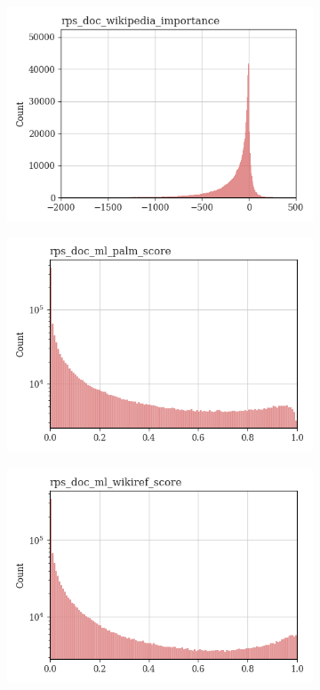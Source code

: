 \documentclass{article}
\begin{document}
\begin{figure}
\begin{subfigure}[b]{0.32\textwidth}
        \includegraphics[width=\textwidth]{figures/quality_signals/rps_doc_wikipedia_importance.png}
    \end{subfigure}
    \begin{subfigure}[b]{0.32\textwidth}
        \centering
        \includegraphics[width=\textwidth]{figures/quality_signals/rps_doc_ml_palm_score.png}
    \end{subfigure}
    \begin{subfigure}[b]{0.32\textwidth}
        \centering
        \includegraphics[width=\textwidth]{figures/quality_signals/rps_doc_ml_wikiref_score.png}

\end{subfigure}
\end{figure}
\end{document}
